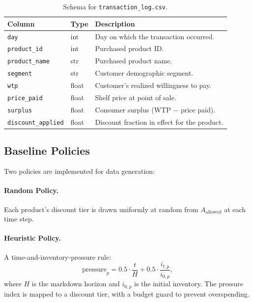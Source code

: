 \documentclass[11pt,a4paper]{article}
\begin{document}
\begin{table}[H]
\centering
\caption{Schema for \texttt{transaction\_log.csv}.}
\begin{tabular}{@{}llp{7cm}@{}}
\toprule
\textbf{Column} & \textbf{Type} & \textbf{Description} \\
\midrule
\texttt{day} & int & Day on which the transaction occurred. \\
\texttt{product\_id} & int & Purchased product ID. \\
\texttt{product\_name} & str & Purchased product name. \\
\texttt{segment} & str & Customer demographic segment. \\
\texttt{wtp} & float & Customer's realized willingness to pay. \\
\texttt{price\_paid} & float & Shelf price at point of sale. \\
\texttt{surplus} & float & Consumer surplus (WTP $-$ price paid). \\
\texttt{discount\_applied} & float & Discount fraction in effect for the product. \\
\bottomrule
\end{tabular}
\end{table}

\subsection{Baseline Policies}

Two policies are implemented for data generation:

\paragraph{Random Policy.}
Each product's discount tier is drawn uniformly at random from $A_{\text{allowed}}$ at each time step.

\paragraph{Heuristic Policy.}
A time-and-inventory-pressure rule:
\begin{equation}
\text{pressure}_p = 0.5 \cdot \frac{t}{H} + 0.5 \cdot \frac{i_{t,p}}{i_{0,p}},
\end{equation}
where $H$ is the markdown horizon and $i_{0,p}$ is the initial inventory.
The pressure index is mapped to a discount tier, with a budget guard to prevent overspending.
\end{document}
